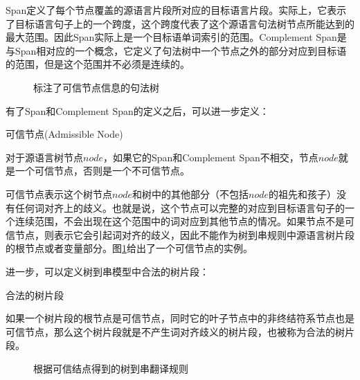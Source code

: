 \parinterval Span定义了每个节点覆盖的源语言片段所对应的目标语言片段。实际上，它表示了目标语言句子上的一个跨度，这个跨度代表了这个源语言句法树节点所能达到的最大范围。因此Span实际上是一个目标语单词索引的范围。Complement Span是与Span相对应的一个概念，它定义了句法树中一个节点之外的部分对应到目标语的范围，但是这个范围并不必须是连续的。

\begin{figure}[htp]
\centering

\caption{标注了可信节点信息的句法树}
\label{fig:4-51}
\end{figure}

\parinterval 有了Span和Complement Span的定义之后，可以进一步定义：

\vspace{0.5em}
\begin{definition} 可信节点(Admissible Node)

{\small
对于源语言树节点$node$，如果它的Span和Complement Span不相交，节点$node$就是一个可信节点，否则是一个不可信节点。
}
\end{definition}

\parinterval 可信节点表示这个树节点$node$和树中的其他部分（不包括$node$的祖先和孩子）没有任何词对齐上的歧义。也就是说，这个节点可以完整的对应到目标语言句子的一个连续范围，不会出现在这个范围中的词对应到其他节点的情况。如果节点不是可信节点，则表示它会引起词对齐的歧义，因此不能作为树到串规则中源语言树片段的根节点或者变量部分。图\ref{fig:4-51}给出了一个可信节点的实例。

\parinterval 进一步，可以定义树到串模型中合法的树片段：

\vspace{0.5em}
\begin{definition} 合法的树片段

{\small
如果一个树片段的根节点是可信节点，同时它的叶子节点中的非终结符系节点也是可信节点，那么这个树片段就是不产生词对齐歧义的树片段，也被称为合法的树片段。
}
\end{definition}

\begin{figure}[htp]
\centering

\caption{根据可信结点得到的树到串翻译规则}
\label{fig:4-52}
\end{figure}


